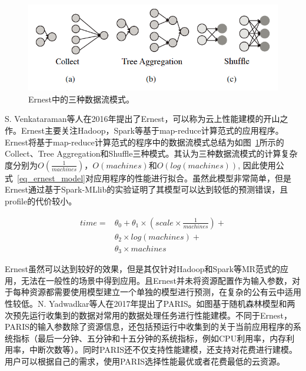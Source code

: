 \begin{figure}[h]
    \centerline{\includegraphics[width=\textwidth]{figures/ernest-data-flow.png}}
    \caption{Ernest中的三种数据流模式。}
    \label{ernest_data_flow}
\end{figure}

S. Venkataraman等人在2016年提出了Ernest\parencite{venkataraman2016ernest}，可以称为云上性能建模的开山之作。Ernest主要关注Hadoop，Spark等基于map-reduce计算范式的应用程序。Ernest将基于map-reduce计算范式的程序中的数据流模式总结为如图~\ref{ernest_data_flow}所示的Collect、Tree Aggregation和Shuffle三种模式。其认为三种数据流模式的计算复杂度分别为$O(\frac{1}{machines})$，$O(machines)$和$O(log(machines))$, 因此使用公式~\ref{eq_ernest_model}对应用程序的性能进行拟合。虽然此模型非常简单，但是Ernest通过基于Spark-MLlib的实验证明了其模型可以达到较低的预测错误，且profile的代价较小。

\begin{equation}\label{eq_ernest_model}
    \begin{aligned}
    time =& \theta_0 + \theta_1 \times (scale \times \frac{1}{machines}) + \\
        &\theta_2 \times log(machines) + \\
        &\theta_3 \times machines
    \end{aligned}
\end{equation}

Ernest虽然可以达到较好的效果，但是其仅针对Hadoop和Spark等MR范式的应用，无法在一般性的场景中得到应用。且Ernest并未将资源配置作为输入参数，对于每种资源都需要使用模型建立一个单独的模型进行预测，在复杂的公有云中适用性较低。N. Yadwadkar等人在2017年提出了PARIS\parencite{yadwadkar2017selecting}。如图基于随机森林模型和两次预先运行收集到的数据对常用的数据处理任务进行性能建模。不同于Ernest，PARIS的输入参数除了资源信息，还包括预运行中收集到的关于当前应用程序的系统指标（最后一分钟、五分钟和十五分钟的系统指标，例如CPU利用率，内存利用率，中断次数等）。同时PARIS还不仅支持性能建模，还支持对花费进行建模。用户可以根据自己的需求，使用PARIS选择性能最优或者花费最低的云资源。

